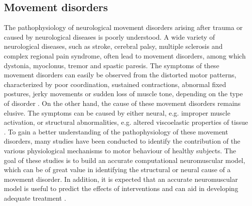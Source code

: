%
%
%



\subsection*{Movement disorders}

The pathophysiology of neurological movement disorders arising after trauma or caused by neurological diseases is poorly understood. A wide variety of neurological diseases, such as stroke, cerebral palsy, multiple sclerosis and complex regional pain syndrome, often lead to movement disorders, among which dystonia, myoclonus, tremor and spastic paresis. The symptoms of these movement disorders can easily be observed from the distorted motor patterns, characterized by poor coordination, sustained contractions, abnormal fixed postures, jerky movements or sudden loss of muscle tone, depending on the type of disorder \cite{levy_myoclonus_2016, de_gooijer-van_de_groep_differentiation_2013, munts_fixed_2011}. On the other hand, the cause of these movement disorders remains elusive. The symptoms can be caused by either neural, e.g. improper muscle activation, or structural abnormalities, e.g. altered viscoelastic properties of tissue \cite{de_gooijer-van_de_groep_differentiation_2013}. To gain a better understanding of the pathophysiology of these movement disorders, many studies have been conducted to identify the contribution of the various physiological mechanisms to motor behaviour of healthy subjects. The goal of these studies is to build an accurate computational neuromuscular model, which can be of great value in identifying the structural or neural cause of a movement disorder. In addition, it is expected that an accurate neuromuscular model is useful to predict the effects of interventions and can aid in developing adequate treatment \cite{meskers_neurocontrol_2015}.


